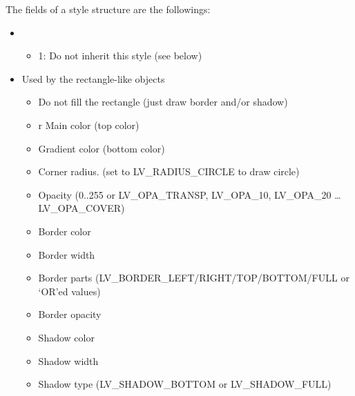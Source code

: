 \documentclass[letterpaper,10pt,english]{sphinxmanual}
\begin{document}
The fields of a style structure are the followings:
\begin{itemize}
\item {} 
\begin{itemize}
\item {} 
 1: Do not inherit this style (see below)

\end{itemize}

\item {} 
 Used by the rectangle-like objects
\begin{itemize}
\item {} 
 Do not fill the rectangle (just draw border and/or shadow)

\item {} 
r Main color (top color)

\item {} 
 Gradient color (bottom color)

\item {} 
 Corner radius. (set to LV\_RADIUS\_CIRCLE to draw circle)

\item {} 
 Opacity (0..255 or LV\_OPA\_TRANSP, LV\_OPA\_10, LV\_OPA\_20 … LV\_OPA\_COVER)

\item {} 
 Border color

\item {} 
 Border width

\item {} 
 Border parts (LV\_BORDER\_LEFT/RIGHT/TOP/BOTTOM/FULL or ‘OR’ed values)

\item {} 
 Border opacity

\item {} 
 Shadow color

\item {} 
 Shadow width

\item {} 
 Shadow type (LV\_SHADOW\_BOTTOM or LV\_SHADOW\_FULL)


\end{itemize}
\end{itemize}
\end{document}
